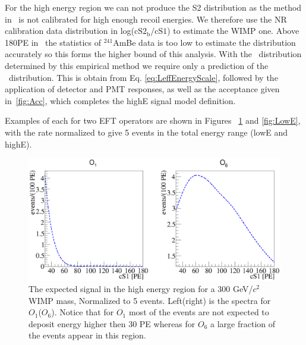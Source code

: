 For the high energy region we can not produce the S2 distribution as the method in~\cite{DataMCXenon} is not calibrated for high enough recoil energies. We therefore use the NR calibration data distribution in log($\mathrm{cS2_b/cS1}$) to estimate the WIMP one. Above 180PE in \cSi\ the statistics of $^{241}$AmBe data is too low to estimate the distribution accurately so this forms the higher bound of this analysis. With the \cSiib\ distribution determined by this empirical method we require only a prediction of the \cSi\ distribution. This is obtain from Eq. \ref{eq:LeffEnergyScale}, followed by the application of detector and PMT responses, as well as the acceptance given in~\ref{fig:Acc}, which completes the highE signal model definition.

Examples of each for two EFT operators are shown in Figures ~\ref{fig:HighE} and \ref{fig:LowE}, with the rate normalized to give 5 events in the total energy range (lowE and highE).

\begin{figure}[h!]
\begin{minipage}{1.\linewidth}
\centerline{\includegraphics[width=1.\linewidth]{Figures/SigHighO1O6.eps}}
\end{minipage}
\caption{The expected signal in the high energy region for a 300 GeV/$c^2$ WIMP mass, Normalized to 5 events. Left(right) is the spectra for $O_1$($O_6$). Notice that for $O_1$ most of the events are not expected to deposit energy higher then 30 PE whereas for $O_6$ a large fraction of the events appear in this region.}
\label{fig:HighE}
\end{figure} 

